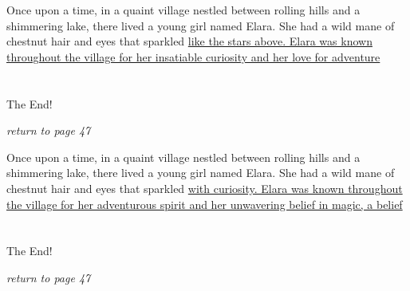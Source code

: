 \documentclass{memoir}
\begin{document}
        


        \hspace{1cm}\vfill
        \begin{minipage}{3in}
        \LARGE
        Once upon a time, in a quaint village nestled between rolling hills and a shimmering lake, there lived a young girl named Elara. She had a wild mane of chestnut hair and eyes that sparkled \ul{like the stars above. Elara was known throughout the village for her insatiable curiosity and her love for adventure}\\ \vspace{5mm} \\
 \\\vspace{1cm} The End! \\ 

        \hspace{1cm}\begin{minipage}{6cm}
        \normalsize
            \hfill \textit{return to page 47}
        \end{minipage} 
        \end{minipage}
        \hspace{1cm}\vfill
        \cleardoublepage

        


        \hspace{1cm}\vfill
        \begin{minipage}{3in}
        \LARGE
        Once upon a time, in a quaint village nestled between rolling hills and a shimmering lake, there lived a young girl named Elara. She had a wild mane of chestnut hair and eyes that sparkled \ul{with curiosity. Elara was known throughout the village for her adventurous spirit and her unwavering belief in magic, a belief}\\ \vspace{5mm} \\
 \\\vspace{1cm} The End! \\ 

        \hspace{1cm}\begin{minipage}{6cm}
        \normalsize
            \hfill \textit{return to page 47}
        \end{minipage} 
        \end{minipage}
        \hspace{1cm}\vfill
        \cleardoublepage
\end{document}
